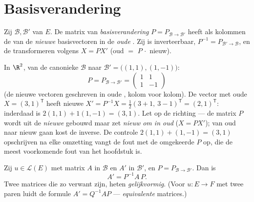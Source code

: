 \section{Basisverandering}

\begin{definition}\label{def:b1:matrices:changeofbasis}
Zij $\mathcal{B}, \mathcal{B}'$  van $E$. De matrix van
\emph{basisverandering} $P =
P_{\mathcal{B}\to\mathcal{B}'}$ heeft als kolommen de 
van de \emph{nieuwe} basisvectoren in de \emph{oude} . Zij is
inverteerbaar, $P^{-1} = P_{\mathcal{B}'\to\mathcal{B}}$, en de
 transformeren volgens $X = PX'$ (oud $=$ $P\,\cdot$
nieuw).
\end{definition}

\begin{example}
\label{ex:b1:matrices:changerun}
In $\R^2$, van de canonieke $\mathcal B$ naar $\mathcal B' =
\bigl((1,1), (1,-1)\bigr)$:
\[
P = P_{\mathcal B\to\mathcal B'} =
\begin{pmatrix} 1 & 1\\ 1 & -1 \end{pmatrix}
\]
(de nieuwe vectoren geschreven in oude , kolom voor
kolom). De vector met oude  $X = (3, 1)^{\mathsf T}$
heeft nieuwe  $X' = P^{-1}X = \frac12(3 + 1,\ 3 -
1)^{\mathsf T} = (2, 1)^{\mathsf T}$: inderdaad is $2(1,1) +
1(1,-1) = (3,1)$. Let op de richting --- de matrix $P$ wordt uit de
\emph{nieuwe}  gebouwd maar zet \emph{nieuw om in oud} ($X =
PX'$); van oud naar nieuw gaan kost de inverse. De controle
$2(1,1) + (1,-1) = (3,1)$ opschrijven na elke omzetting vangt de
fout met de omgekeerde $P$ op, die de meest voorkomende fout van
het hoofdstuk is.
\end{example}

\begin{theorem}\label{thm:b1:matrices:conjugation}
Zij $u \in \mathcal{L}(E)$ met matrix $A$ in $\mathcal{B}$ en $A'$
in $\mathcal{B}'$, en $P = P_{\mathcal{B}\to\mathcal{B}'}$. Dan is
\[
A' = P^{-1} A\, P .
\]
Twee matrices die zo verwant zijn, heten
\emph{gelijkvormig}. (Voor $u \colon E
\to F$ met twee paren  luidt de formule $A' = Q^{-1} A P$ ---
\emph{equivalente} matrices.)
\end{theorem}

